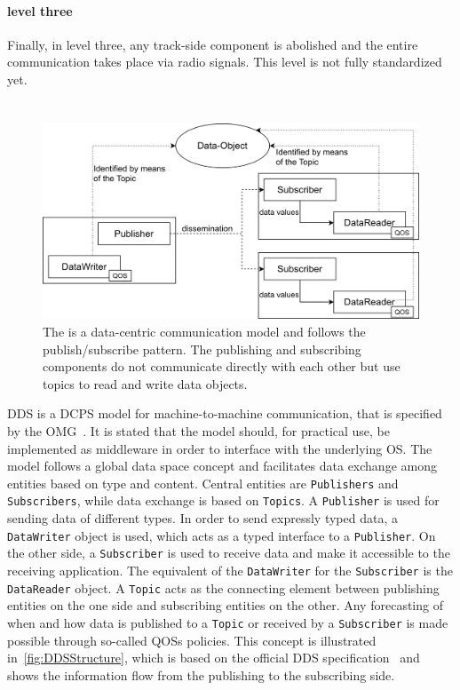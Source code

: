 \paragraph{ level three}
Finally, in  level three, any track-side component is abolished and the entire communication takes place via radio signals.
This  level is not fully standardized yet.

\section{}

\begin{figure}[!hb]
	\centering
	\includegraphics[width=0.8\linewidth]{images/DDSStructure}
	\caption{The  is a data-centric communication model and follows the publish/subscribe pattern. The publishing and subscribing components do not communicate directly with each other but use topics to read and write data objects.}
	\label{fig:DDSStructure}
\end{figure}

\Gls*{DDS} is a \gls*{DCPS} model for machine-to-machine communication, that is specified by the \gls*{OMG}~\cite{omgDDSspec}.
It is stated that the model should, for practical use, be implemented as middleware in order to interface with the underlying \gls*{OS}.
The model follows a global data space concept and facilitates data exchange among entities based on type and content.
Central entities are \texttt{Publishers} and \texttt{Subscribers}, while data exchange is based on \texttt{Topics}.
A \texttt{Publisher} is used for sending data of different types.
In order to send expressly typed data, a \texttt{DataWriter} object is used, which acts as a typed interface to a \texttt{Publisher}.
On the other side, a \texttt{Subscriber} is used to receive data and make it accessible to the receiving application.
The equivalent of the \texttt{DataWriter} for the \texttt{Subscriber} is the \texttt{DataReader} object.
A \texttt{Topic} acts as the connecting element between publishing entities on the one side and subscribing entities on the other.
Any forecasting of when and how data is published to a \texttt{Topic} or received by a \texttt{Subscriber} is made possible through so-called \glspl*{QOS} policies.
This concept is illustrated in~\autoref{fig:DDSStructure}, which is based on the official \gls*{DDS} specification~\cite{omgDDSspec} and shows the information flow from the publishing to the subscribing side.

